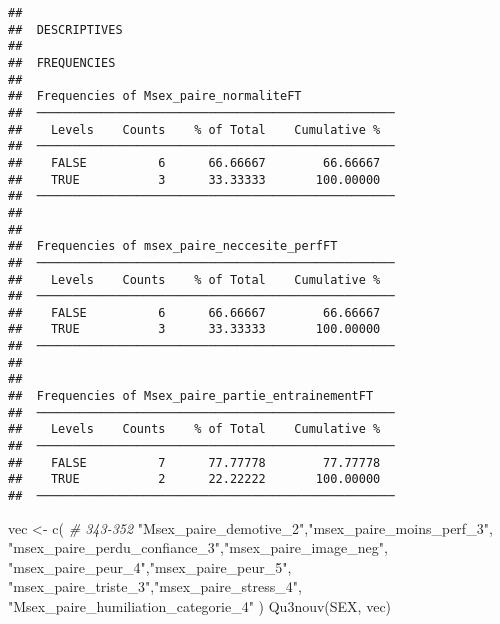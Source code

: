 \documentclass[
]{article}
\newenvironment{Shaded}{\begin{snugshade}}{\end{snugshade}}
\newcommand{\CommentTok}[1]{\textcolor[rgb]{0.56,0.35,0.01}{\textit{#1}}}
\newcommand{\FunctionTok}[1]{\textcolor[rgb]{0.00,0.00,0.00}{#1}}
\newcommand{\NormalTok}[1]{#1}
\newcommand{\OtherTok}[1]{\textcolor[rgb]{0.56,0.35,0.01}{#1}}
\newcommand{\StringTok}[1]{\textcolor[rgb]{0.31,0.60,0.02}{#1}}
\begin{document}
\begin{verbatim}
## 
##  DESCRIPTIVES
## 
##  FREQUENCIES
## 
##  Frequencies of Msex_paire_normaliteFT              
##  ────────────────────────────────────────────────── 
##    Levels    Counts    % of Total    Cumulative %   
##  ────────────────────────────────────────────────── 
##    FALSE          6      66.66667        66.66667   
##    TRUE           3      33.33333       100.00000   
##  ────────────────────────────────────────────────── 
## 
## 
##  Frequencies of msex_paire_neccesite_perfFT         
##  ────────────────────────────────────────────────── 
##    Levels    Counts    % of Total    Cumulative %   
##  ────────────────────────────────────────────────── 
##    FALSE          6      66.66667        66.66667   
##    TRUE           3      33.33333       100.00000   
##  ────────────────────────────────────────────────── 
## 
## 
##  Frequencies of Msex_paire_partie_entrainementFT    
##  ────────────────────────────────────────────────── 
##    Levels    Counts    % of Total    Cumulative %   
##  ────────────────────────────────────────────────── 
##    FALSE          7      77.77778        77.77778   
##    TRUE           2      22.22222       100.00000   
##  ──────────────────────────────────────────────────
\end{verbatim}

\begin{Shaded}
\begin{Highlighting}[]
\NormalTok{vec }\OtherTok{\textless{}{-}} \FunctionTok{c}\NormalTok{(  }\CommentTok{\# 343{-}352}
  \StringTok{"Msex\_paire\_demotive\_2"}\NormalTok{,}\StringTok{"msex\_paire\_moins\_perf\_3"}\NormalTok{,                         }
  \StringTok{"msex\_paire\_perdu\_confiance\_3"}\NormalTok{,}\StringTok{"msex\_paire\_image\_neg"}\NormalTok{,                                }
  \StringTok{"msex\_paire\_peur\_4"}\NormalTok{,}\StringTok{"msex\_paire\_peur\_5"}\NormalTok{,                              }
  \StringTok{"msex\_paire\_triste\_3"}\NormalTok{,}\StringTok{"msex\_paire\_stress\_4"}\NormalTok{,                                 }
  \StringTok{"Msex\_paire\_humiliation\_categorie\_4"}              
\NormalTok{  )}
\FunctionTok{Qu3nouv}\NormalTok{(SEX, vec)}
\end{Highlighting}
\end{Shaded}
\end{document}
